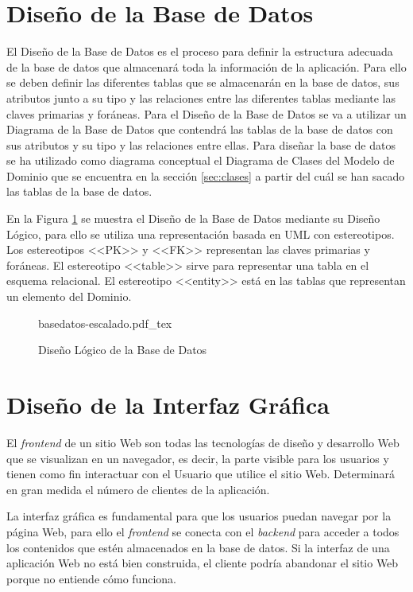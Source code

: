  \section{Diseño de la Base de Datos}
El Diseño de la Base de Datos \cite{diseno-base} es el proceso para definir la estructura adecuada de la base de datos que almacenará toda la información de la aplicación. Para ello se deben definir las diferentes tablas que se almacenarán en la base de datos, sus atributos junto a su tipo y las relaciones entre las diferentes tablas mediante las claves primarias y foráneas. Para el Diseño de la Base de Datos se va a utilizar un Diagrama de la Base de Datos que contendrá las tablas de la base de datos con sus atributos y su tipo y las relaciones entre ellas. Para diseñar la base de datos se ha utilizado como diagrama conceptual el Diagrama de Clases del Modelo de Dominio que se encuentra en la sección \ref{sec:clases} a partir del cuál se han sacado las tablas de la base de datos.

En la Figura \ref{fig:diagrama-basedatos} se muestra el Diseño de la Base de Datos mediante su Diseño
Lógico, para ello se utiliza una representación basada en UML con estereotipos. 
Los estereotipos <<PK>> y <<FK>> representan las claves primarias y foráneas. El estereotipo <<table>> sirve para representar una tabla en el esquema relacional. El estereotipo <<entity>> está en las tablas que representan un elemento del Dominio.

\begin{figure}
    \centering
    \begin{normalsize}
        {basedatos-escalado.pdf_tex}
    \end{normalsize}
    \caption{Diseño Lógico de la Base de Datos}
     \label{fig:diagrama-basedatos}
 
 \end{figure}



\section{Diseño de la Interfaz Gráfica}
El \textit{frontend} \cite{frontend} de un sitio Web son todas las tecnologías de diseño y desarrollo Web que se visualizan en un navegador, es decir, la parte visible para los usuarios y tienen como fin interactuar con el Usuario que utilice el sitio Web. Determinará en gran medida el número de clientes de la aplicación.

La interfaz gráfica es fundamental para que los usuarios puedan navegar por la página Web, para ello el \textit{frontend}  se conecta con el \textit{backend} para acceder a todos los contenidos que estén almacenados en la base de datos. Si la interfaz de una aplicación Web no está bien construida, el cliente podría abandonar el sitio Web porque no entiende cómo funciona.  

